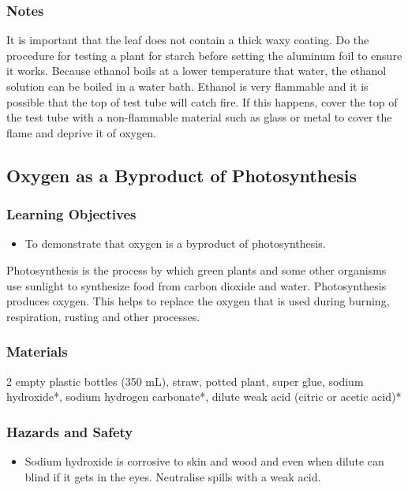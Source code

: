 \subsubsection*{Notes}
It is important that the leaf does not contain a thick waxy coating. Do the procedure for testing a plant for starch before setting the aluminum foil to ensure it works.
Because ethanol boils at a lower temperature that water, the ethanol solution can be boiled in a water bath. Ethanol is very flammable and it is possible that the top of test tube will catch fire. If this happens, cover the top of the test tube with a non-flammable material such as glass or metal to cover the flame and deprive it of oxygen.

\subsection{Oxygen as a Byproduct of Photosynthesis}

\subsubsection*{Learning Objectives}
\begin{itemize}
\item{To demonstrate that oxygen is a byproduct of photosynthesis.}
\end{itemize}


Photosynthesis is the process by which green plants and some other organisms use sunlight to synthesize food from carbon dioxide and water. Photosynthesis produces oxygen. This helps to replace the oxygen that is used during burning, respiration, rusting and other processes.

\subsubsection*{Materials}
2 empty plastic bottles (350 mL), straw, potted plant, super glue, sodium hydroxide*, sodium hydrogen carbonate*, dilute weak acid (citric or acetic acid)*

\subsubsection*{Hazards and Safety}
\begin{itemize}
\item{Sodium hydroxide is corrosive to skin and wood and even when dilute can blind if it gets in the eyes. Neutralise spills with a weak acid.}
\end{itemize}


